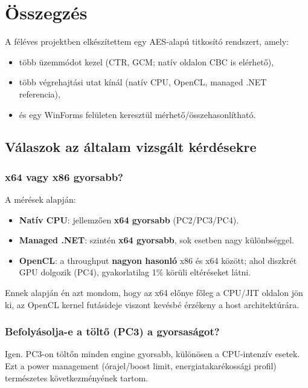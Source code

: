 \chapter{Összegzés}

A féléves projektben elkészítettem egy AES-alapú titkosító rendszert, amely:

\begin{itemize}
  \item több üzemmódot kezel (CTR, GCM; natív oldalon CBC is elérhető),
  \item több végrehajtási utat kínál (natív CPU, OpenCL, managed .NET referencia),
  \item és egy WinForms felületen keresztül mérhető/összehasonlítható.
\end{itemize}

\section{Válaszok az általam vizsgált kérdésekre}

\subsection{x64 vagy x86 gyorsabb?}

A mérések alapján:

\begin{itemize}
  \item \textbf{Natív CPU}: jellemzően \textbf{x64 gyorsabb} (PC2/PC3/PC4).
  \item \textbf{Managed .NET}: szintén \textbf{x64 gyorsabb}, sok esetben nagy különbséggel.
  \item \textbf{OpenCL}: a throughput \textbf{nagyon hasonló} x86 és x64 között; ahol diszkrét GPU dolgozik (PC4),
        gyakorlatilag 1\% körüli eltéréseket látni.
\end{itemize}

Ennek alapján én azt mondom, hogy az x64 előnye főleg a CPU/JIT oldalon jön ki,
az OpenCL kernel futásideje viszont kevésbé érzékeny a host architektúrára.

\subsection{Befolyásolja-e a töltő (PC3) a gyorsaságot?}

Igen. PC3-on töltőn minden engine gyorsabb, különösen a CPU-intenzív esetek.
Ezt a power management (órajel/boost limit, energiatakarékossági profil) természetes következményének tartom.

